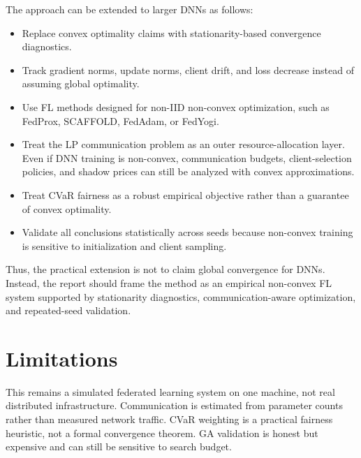 \documentclass{article}
\begin{document}
The approach can be extended to larger DNNs as follows:
\begin{itemize}
\item Replace convex optimality claims with stationarity-based convergence diagnostics.
\item Track gradient norms, update norms, client drift, and loss decrease instead of assuming global optimality.
\item Use FL methods designed for non-IID non-convex optimization, such as FedProx, SCAFFOLD, FedAdam, or FedYogi.
\item Treat the LP communication problem as an outer resource-allocation layer. Even if DNN training is non-convex, communication budgets, client-selection policies, and shadow prices can still be analyzed with convex approximations.
\item Treat CVaR fairness as a robust empirical objective rather than a guarantee of convex optimality.
\item Validate all conclusions statistically across seeds because non-convex training is sensitive to initialization and client sampling.
\end{itemize}

Thus, the practical extension is not to claim global convergence for DNNs. Instead, the report should frame the method as an empirical non-convex FL system supported by stationarity diagnostics, communication-aware optimization, and repeated-seed validation.
\section{Limitations}
This remains a simulated federated learning system on one machine, not real distributed infrastructure. Communication is estimated from parameter counts rather than measured network traffic. CVaR weighting is a practical fairness heuristic, not a formal convergence theorem. GA validation is honest but expensive and can still be sensitive to search budget.
\end{document}
